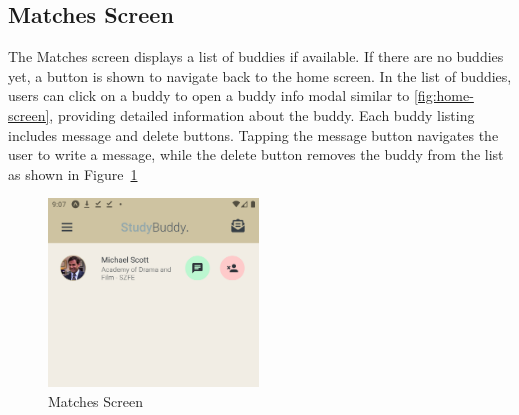 \subsection{Matches Screen}
The Matches screen displays a list of buddies if available. If there are no buddies yet, a button is shown to navigate back to the home screen. In the list of buddies, users can click on a buddy to open a buddy info modal similar to \ref{fig:home-screen}, providing detailed information about the buddy. Each buddy listing includes message and delete buttons. Tapping the message button navigates the user to write a message, while the delete button removes the buddy from the list as shown in Figure~\ref{fig:matches-screen}
   \begin{figure}[H]
	\centering
		\includegraphics[width=0.45\linewidth, width=6cm, height=5cm]{images/snapshots/matches_screen.png}
        \caption{Matches Screen}
	\label{fig:matches-screen}
  \end{figure}
